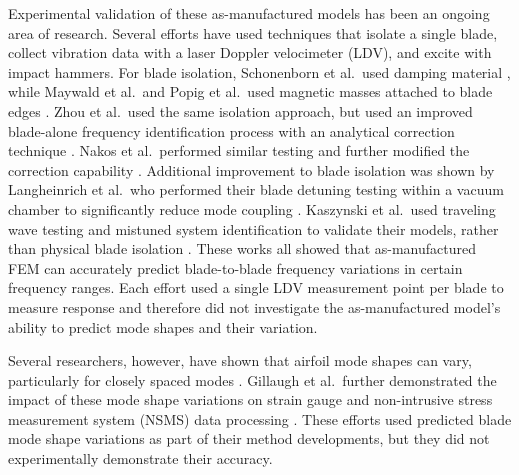 \documentclass[colorlinks,upint,subscriptcorrection,varvw,hyphenate,balance,govt]{asmeconf}
\begin{document}
Experimental validation of these as-manufactured models has been an ongoing area of research. Several efforts have used techniques that isolate a single blade, collect vibration data with a laser Doppler velocimeter (LDV), and excite with impact hammers. For blade isolation, Schonenborn et al.\ used damping material \cite{Schoenenborn2009}, while Maywald et al.\ and Popig et al.\ used magnetic masses attached to blade edges \cite{Maywald2017, Popig2015}. Zhou et al.\ used the same isolation approach, but used an improved blade-alone frequency identification process with an analytical correction technique \cite{Zhou2022}. Nakos et al.\ performed similar testing and further modified the correction capability \cite{Nakos2025}. Additional improvement to blade isolation was shown by Langheinrich et al.\ who performed their blade detuning testing within a vacuum chamber to significantly reduce mode coupling \cite{Langheinrich2024}. Kaszynski et al.\ used traveling wave testing and mistuned system identification to validate their models, rather than physical blade isolation \cite{Kaszynski2015}. These works all showed that as-manufactured FEM can accurately predict blade-to-blade frequency variations in certain frequency ranges. Each effort used a single LDV measurement point per blade to measure response and therefore did not investigate the as-manufactured model's ability to predict mode shapes and their variation.

Several researchers, however, have shown that airfoil mode shapes can vary, particularly for closely spaced modes \cite{Brown2019, Bae2019}. Gillaugh et al.\ further demonstrated the impact of these mode shape variations on strain gauge and non-intrusive stress measurement system (NSMS) data processing \cite{Gillaugh2018, Gillaugh2019}. These efforts used predicted blade mode shape variations as part of their method developments, but they did not experimentally demonstrate their accuracy.
\end{document}
